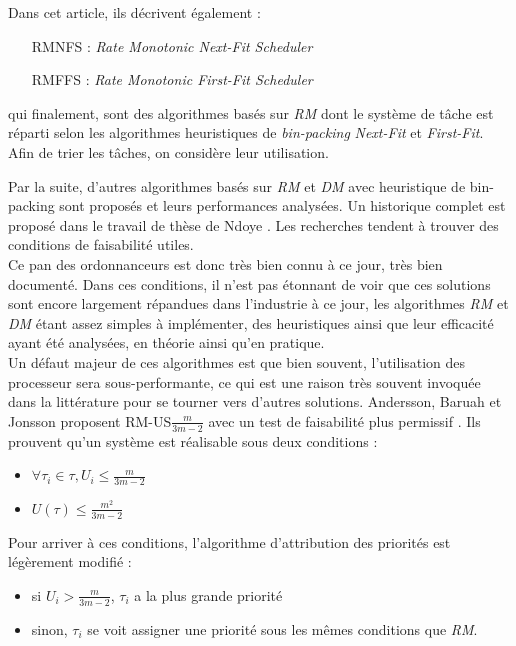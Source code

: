 \documentclass[11pt,a4paper,oneside]{report}
\begin{document}
Dans cet article, ils décrivent également :\\
\begin{itemize}
	\item[RMNFS] : \textit{Rate Monotonic Next-Fit Scheduler}
	\item[RMFFS] : \textit{Rate Monotonic First-Fit Scheduler}
\end{itemize}
\vspace{1em}
qui finalement, sont des algorithmes basés sur \textit{RM} dont le système de tâche est 
réparti selon les algorithmes heuristiques de \textit{bin-packing} \textit{Next-Fit} et \textit{First-Fit}. 
Afin de trier les tâches, on considère leur utilisation.


Par la suite, d'autres algorithmes basés sur \textit{RM} et \textit{DM} avec 
heuristique de bin-packing sont proposés et leurs performances analysées. 
Un historique complet est proposé dans le travail de thèse de Ndoye \cite{ndoye_ordonnancement_2014}. 
Les recherches tendent à trouver des conditions de faisabilité utiles.\\

Ce pan des ordonnanceurs est donc très bien connu à ce jour, très bien documenté. 
Dans ces conditions, il n'est pas étonnant de voir que ces solutions sont encore largement 
répandues dans l'industrie à ce jour, les algorithmes \textit{RM} et \textit{DM} 
étant assez simples à implémenter, des heuristiques ainsi que leur efficacité ayant été analysées, en théorie ainsi qu'en pratique.\\

Un défaut majeur de ces algorithmes est que bien souvent, l'utilisation des processeur sera 
sous-performante, ce qui est une raison très souvent invoquée dans la littérature pour se 
tourner vers d'autres solutions. 
Andersson, Baruah et Jonsson proposent RM-US$\frac{m}{3m-2}$ avec un test 
de faisabilité plus permissif \cite{andersson_static-priority_2001}. Ils prouvent 
qu'un système est réalisable sous deux conditions :\\
\begin{itemize}
	\item $\forall \tau_i \in \tau, U_i \leq \frac{m}{3m-2}$
	\item $U(\tau) \leq \frac{m^2}{3m-2}$ 
\end{itemize}
\vspace{1em}
Pour arriver à ces conditions, l'algorithme d'attribution des priorités est légèrement modifié : \\
\begin{itemize}
	\item si $U_i > \frac{m}{3m-2}$, $\tau_i$ a la plus grande priorité
	\item sinon, $\tau_i$ se voit assigner une priorité sous les mêmes conditions que \textit{RM}.
\end{itemize}
\end{document}
